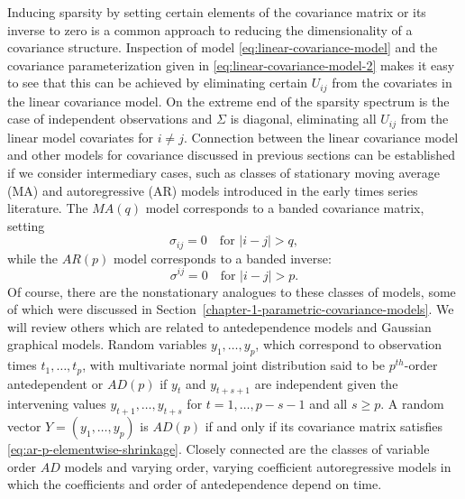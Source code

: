 \bigskip

Inducing sparsity by setting certain elements of the covariance matrix or its inverse to zero is a common approach to reducing the dimensionality of a covariance structure. Inspection of model \eqref{eq:linear-covariance-model} and the covariance parameterization given in \eqref{eq:linear-covariance-model-2} makes it easy to see that this can be achieved by eliminating certain $U_{ij}$ from the covariates in the linear covariance model. On the extreme end of the sparsity spectrum is the case of independent observations and $\Sigma$ is diagonal, eliminating all $U_{ij}$ from the linear model covariates for $i \ne j$. Connection between the linear covariance model and other models for covariance discussed in previous sections can be established if we consider intermediary cases, such as classes of stationary moving average (MA) and autoregressive (AR) models introduced in the early times series literature. The $MA(q)$ model corresponds to a banded covariance matrix, setting 
\begin{equation}  \label{eq:ar-p-elementwise-shrinkage}
\sigma_{ij} = 0 \quad \mbox{for }\vert i - j \vert > q, 
\end{equation}
\noindent
while the $AR(p)$ model corresponds to a banded inverse:
\begin{equation} \label{eq:ar-p-elementwise-shrinkage}
\sigma^{ij} = 0 \quad \mbox{for }\vert i - j \vert > p. 
\end{equation}
Of course, there are the nonstationary analogues to these classes of models, some of which were discussed in Section~\ref{chapter-1-parametric-covariance-models}. We will review others which are related to antedependence models and Gaussian graphical models. Random variables $y_1, \dots, y_p$, which correspond to observation times $t_1,\dots, t_p$, with multivariate normal joint distribution said to be $p^{th}$-order antedependent or $AD(p)$ \citep{gabriel1962ante} if $y_t$ and $y_{t+s+1}$ are independent given the intervening values $y_{t+1}, \dots , y_{t+s}$ for $t = 1, \dots , p - s - 1$ and all $s \ge p$. A random vector $Y = \left(y_1, \dots , y_p\right)$ is $AD(p)$ if and only if its covariance matrix satisfies \eqref{eq:ar-p-elementwise-shrinkage}. Closely connected are the classes of variable order $AD$ models and varying order, varying coefficient autoregressive models \citep{kitagawa1985smoothness} in which the coefficients and order of antedependence depend on time. 




